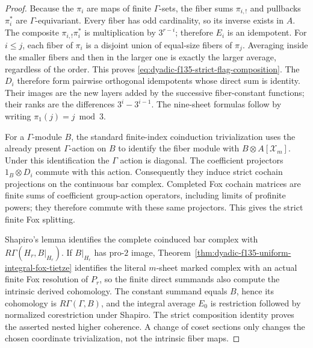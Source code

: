 \begin{proof}
Because the
$\pi_i$ are
maps of finite
$\Gamma$-sets,
the fiber sums
$\pi_{i,!}$
and pullbacks
$\pi_i^*$
are
$\Gamma$-equivariant.
Every fiber
has odd
cardinality,
so its inverse
exists in $A$.
The composite
$\pi_{i,!}\pi_i^*$
is multiplication
by $3^{r-i}$;
therefore
$E_i$ is an
idempotent.
For $i\le j$,
each fiber of
$\pi_i$ is a
disjoint union
of equal-size
fibers of
$\pi_j$.
Averaging
inside the
smaller
fibers and
then in the
larger one
is exactly
the larger
average,
regardless of
the order.
This proves
\eqref{eq:dyadic-f135-strict-flag-composition}.
The $D_i$
therefore form
pairwise
orthogonal
idempotents
whose direct
sum is identity.
Their images
are the new
layers added
by the
successive
fiber-constant
functions;
their ranks
are the
differences
$3^i-3^{i-1}$.
The nine-sheet
formulas follow
by writing
$\pi_1(j)=j\bmod3$.

For a
$\Gamma$-module
$B$, the
standard
finite-index
coinduction
trivialization
uses the
already present
$\Gamma$-action
on $B$ to
identify
the fiber
module with
$B\otimes A[\mathscr X_m]$.
Under this
identification
the $\Gamma$
action is
diagonal.
The coefficient
projectors
$1_B\otimes D_i$
commute with
this action.
Consequently
they induce
strict
cochain
projections
on the
continuous
bar complex.
Completed
Fox cochain
matrices are
finite sums
of coefficient
group-action
operators,
including
limits of
profinite powers;
they therefore
commute with
these same
projectors.
This gives
the strict
finite
Fox splitting.

Shapiro's
lemma
identifies
the complete
coinduced
bar complex
with
$R\Gamma(H_r,B|_{H_r})$.
If $B|_{H_r}$
has pro-$2$
image,
Theorem~\ref{thm:dyadic-f135-uniform-integral-fox-tietze}
identifies the
literal $m$-sheet
marked complex
with an
actual finite
Fox resolution
of $P_r$,
so the finite
direct summands
also compute
the intrinsic
derived
cohomology.
The constant
summand equals
$B$, hence its
cohomology is
$R\Gamma(\Gamma,B)$,
and the
integral average
$E_0$ is
restriction
followed by
normalized
corestriction
under Shapiro.
The strict
composition
identity proves
the asserted
nested higher
coherence.
A change of
coset sections
only changes
the chosen
coordinate
trivialization,
not the
intrinsic
fiber maps.
\end{proof}

